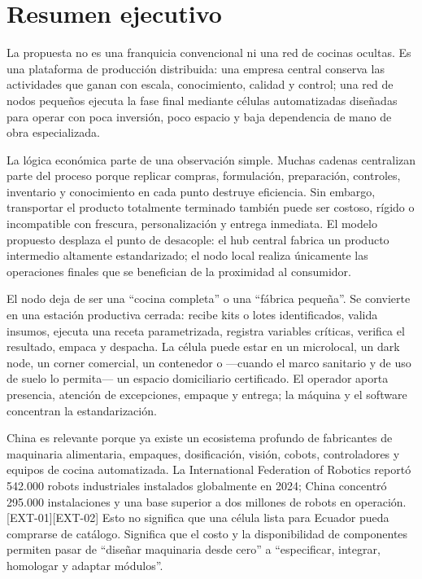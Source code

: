 \documentclass[11pt,a4paper]{article}
\begin{document}
\newpage
\tableofcontents
\newpage

\section{Resumen ejecutivo}

La propuesta no es una franquicia convencional ni una red de cocinas ocultas. Es una plataforma de
producción distribuida: una empresa central conserva las actividades que ganan con escala, conocimiento,
calidad y control; una red de nodos pequeños ejecuta la fase final mediante células automatizadas
diseñadas para operar con poca inversión, poco espacio y baja dependencia de mano de obra especializada.

La lógica económica parte de una observación simple. Muchas cadenas centralizan parte del proceso porque
replicar compras, formulación, preparación, controles, inventario y conocimiento en cada punto destruye
eficiencia. Sin embargo, transportar el producto totalmente terminado también puede ser costoso, rígido o
incompatible con frescura, personalización y entrega inmediata. El modelo propuesto desplaza el punto de
desacople: el hub central fabrica un producto intermedio altamente estandarizado; el nodo local realiza
únicamente las operaciones finales que se benefician de la proximidad al consumidor.

El nodo deja de ser una “cocina completa” o una “fábrica pequeña”. Se convierte en una estación
productiva cerrada: recibe kits o lotes identificados, valida insumos, ejecuta una receta parametrizada,
registra variables críticas, verifica el resultado, empaca y despacha. La célula puede estar en un
microlocal, un dark node, un corner comercial, un contenedor o ---cuando el marco sanitario y de uso de
suelo lo permita--- un espacio domiciliario certificado. El operador aporta presencia, atención de
excepciones, empaque y entrega; la máquina y el software concentran la estandarización.

China es relevante porque ya existe un ecosistema profundo de fabricantes de maquinaria alimentaria,
empaques, dosificación, visión, cobots, controladores y equipos de cocina automatizada. La International
Federation of Robotics reportó 542.000 robots industriales instalados globalmente en 2024; China concentró
295.000 instalaciones y una base superior a dos millones de robots en operación. [EXT-01][EXT-02] Esto no
significa que una célula lista para Ecuador pueda comprarse de catálogo. Significa que el costo y la
disponibilidad de componentes permiten pasar de “diseñar maquinaria desde cero” a “especificar, integrar,
homologar y adaptar módulos”.
\end{document}
